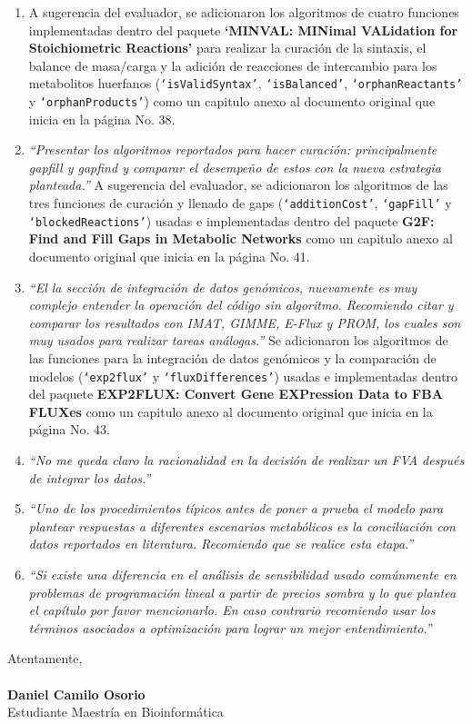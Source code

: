 \documentclass[11pt,a4paper]{article}
\begin{document}
\begin{enumerate}
\item A sugerencia del evaluador, se adicionaron los algoritmos de cuatro funciones implementadas dentro del paquete \textbf{`MINVAL: MINimal VALidation for Stoichiometric Reactions'} para realizar la curación de la sintaxis, el balance de masa/carga y la adición de reacciones de intercambio para los metabolitos huerfanos (\texttt{`isValidSyntax'}, \texttt{`isBalanced'}, \texttt{`orphanReactants'} y \texttt{`orphanProducts'}) como un capitulo anexo al documento original que inicia en la página No. 38.
\item \emph{``Presentar los algoritmos reportados para hacer curación: principalmente gapfill y gapfind y comparar el desempeño de estos con la nueva estrategia planteada.''} A sugerencia del evaluador, se adicionaron los algoritmos de las tres funciones de curación y llenado de gaps  (\texttt{`additionCost'}, \texttt{`gapFill'} y \texttt{`blockedReactions'}) usadas e implementadas dentro del paquete \textbf{G2F: Find and Fill Gaps in Metabolic Networks} como un capitulo anexo al documento original que inicia en la página No. 41.
\item \emph{``El la sección de integración de datos genómicos, nuevamente es muy complejo entender la operación del código sin algoritmo. Recomiendo citar y comparar los resultados con IMAT, GIMME, E-Flux y PROM, los cuales son muy usados para realizar tareas análogas.''} Se adicionaron los algoritmos de las funciones para la integración de datos genómicos y la comparación de modelos  (\texttt{`exp2flux'} y \texttt{`fluxDifferences'}) usadas e implementadas dentro del paquete \textbf{EXP2FLUX: Convert Gene EXPression Data to FBA FLUXes} como un capitulo anexo al documento original que inicia en la página No. 43.
\item \emph{``No me queda claro la racionalidad en la decisión de realizar un FVA después de integrar los datos.''}
\item \emph{``Uno de los procedimientos típicos antes de poner a prueba el modelo para plantear respuestas a diferentes escenarios metabólicos es la conciliación con datos reportados en literatura. Recomiendo que se realice esta etapa.''}
\item \emph{``Si existe una diferencia en el análisis de sensibilidad usado comúnmente en problemas de programación lineal a partir de precios sombra y lo que plantea el capítulo por favor mencionarlo. En caso contrario recomiendo usar los términos asociados a optimización para lograr un mejor entendimiento.''}
\end{enumerate}
Atentamente,\\
\\
\textbf{Daniel Camilo Osorio}\\
Estudiante Maestría en Bioinformática
\end{document}
